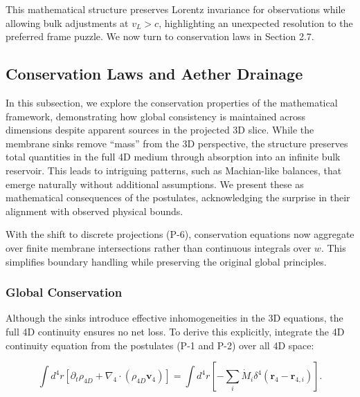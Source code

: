 \medskip
\noindent
{}
\medskip

This mathematical structure preserves Lorentz invariance for observations while allowing bulk adjustments at $v_L > c$, highlighting an unexpected resolution to the preferred frame puzzle. We now turn to conservation laws in Section 2.7.

\subsection{Conservation Laws and Aether Drainage}

In this subsection, we explore the conservation properties of the mathematical framework, demonstrating how global consistency is maintained across dimensions despite apparent sources in the projected 3D slice. While the membrane sinks remove ``mass'' from the 3D perspective, the structure preserves total quantities in the full 4D medium through absorption into an infinite bulk reservoir. This leads to intriguing patterns, such as Machian-like balances, that emerge naturally without additional assumptions. We present these as mathematical consequences of the postulates, acknowledging the surprise in their alignment with observed physical bounds.

With the shift to discrete projections (P-6), conservation equations now aggregate over finite membrane intersections rather than continuous integrals over $w$. This simplifies boundary handling while preserving the original global principles.

\subsubsection{Global Conservation}
Although the sinks introduce effective inhomogeneities in the 3D equations, the full 4D continuity ensures no net loss. To derive this explicitly, integrate the 4D continuity equation from the postulates (P-1 and P-2) over all 4D space:

\begin{equation}
\int d^4 r \left[ \partial_t \rho_{4D} + \nabla_4 \cdot (\rho_{4D} \mathbf{v}_4) \right] = \int d^4 r \left[ -\sum_i \dot{M}_i \delta^4(\mathbf{r}_4 - \mathbf{r}_{4,i}) \right].
\end{equation}

